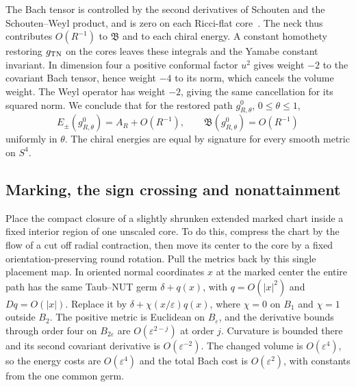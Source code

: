 \documentclass[11pt]{article}
\numberwithin{equation}{section}
\theoremstyle{definition}
\theoremstyle{remark}
\begin{document}
The Bach tensor is controlled by the second derivatives of
Schouten and the Schouten--Weyl product, and is zero on each
Ricci-flat core~\cite[\S1, (1.1)]{BahuaudGuentherIsenbergMazzeo2025Bach}.
The neck thus contributes \(O(R^{-1})\) to \(\mathfrak B\) and to
each chiral energy. A constant homothety restoring \(g_{\rm TN}\)
on the cores leaves these integrals and the Yamabe constant
invariant. In dimension four a positive conformal factor \(u^2\)
gives weight \(-2\) to the covariant Bach tensor, hence weight
\(-4\) to its norm, which cancels the volume weight. The Weyl
operator has weight \(-2\), giving the same cancellation for
its squared norm. We conclude that for the restored path
\(g^0_{R,\theta}\), \(0\le\theta\le1\),
\begin{equation}\label{wall:path}
 E_\pm(g^0_{R,\theta})=A_R+O(R^{-1}),\qquad
 \mathfrak B(g^0_{R,\theta})=O(R^{-1})
\end{equation}
uniformly in \(\theta\). The chiral energies are equal by
signature for every smooth metric on \(S^4\).

\subsection{Marking, the sign crossing and nonattainment}

Place the compact closure of a slightly shrunken extended
marked chart inside a fixed interior region of one unscaled
core. To do this, compress the chart by the flow of a cut off
radial contraction, then move its center to the core by a fixed
orientation-preserving round rotation. Pull the metrics back
by this single placement map. In oriented normal coordinates
\(x\) at the marked center the entire path has the same
Taub--NUT germ \(\delta+q(x)\), with \(q=O(|x|^2)\) and
\(Dq=O(|x|)\). Replace it by
\(\delta+\chi(x/\varepsilon)q(x)\), where \(\chi=0\) on \(B_1\)
and \(\chi=1\) outside \(B_2\). The positive metric is Euclidean
on \(B_\varepsilon\), and the derivative bounds through order
four on \(B_{2\varepsilon}\) are \(O(\varepsilon^{2-j})\) at
order \(j\). Curvature is bounded there and its second covariant
derivative is \(O(\varepsilon^{-2})\). The changed volume is
\(O(\varepsilon^4)\), so the energy costs are \(O(\varepsilon^4)\)
and the total Bach cost is \(O(\varepsilon^2)\), with constants
from the one common germ.
\end{document}
